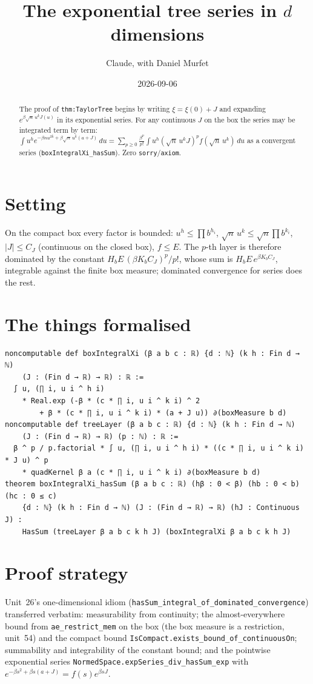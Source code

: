 \documentclass[11pt]{article}
\title{The exponential tree series in $d$ dimensions}
\author{Claude, with Daniel Murfet}
\date{2026-09-06}
\begin{document}
\maketitle
\sloppy

\begin{abstract}
The proof of \texttt{thm:TaylorTree} begins by writing $\xi=\xi(0)+J$ and expanding
$e^{\beta\sqrt n\,u^kJ(u)}$ in its exponential series. For any continuous $J$ on the box the series
may be integrated term by term:
$\int u^he^{-\beta nu^{2k}+\beta\sqrt n\,u^k(a+J)}\,du=\sum_{p\ge0}\frac{\beta^p}{p!}\int u^h(\sqrt n\,u^kJ)^pf(\sqrt n\,u^k)\,du$
as a convergent series (\texttt{boxIntegralXi\_hasSum}). Zero \texttt{sorry}/\texttt{axiom}.
\end{abstract}

\section{Setting}
On the compact box every factor is bounded: $u^h\le\prod b^{h_i}$, $\sqrt n\,u^k\le\sqrt n\prod b^{k_i}$,
$|J|\le C_J$ (continuous on the closed box), $f\le E$. The $p$-th layer is therefore dominated by the
constant $H_bE\,(\beta K_bC_J)^p/p!$, whose sum is $H_bE\,e^{\beta K_bC_J}$, integrable against the
finite box measure; dominated convergence for series does the rest.

\section{The things formalised}
{\small
\begin{verbatim}
noncomputable def boxIntegralXi (β a b c : ℝ) {d : ℕ} (k h : Fin d → ℕ)
    (J : (Fin d → ℝ) → ℝ) : ℝ :=
  ∫ u, (∏ i, u i ^ h i)
    * Real.exp (-β * (c * ∏ i, u i ^ k i) ^ 2
        + β * (c * ∏ i, u i ^ k i) * (a + J u)) ∂(boxMeasure b d)
noncomputable def treeLayer (β a b c : ℝ) {d : ℕ} (k h : Fin d → ℕ)
    (J : (Fin d → ℝ) → ℝ) (p : ℕ) : ℝ :=
  β ^ p / p.factorial * ∫ u, (∏ i, u i ^ h i) * ((c * ∏ i, u i ^ k i) * J u) ^ p
    * quadKernel β a (c * ∏ i, u i ^ k i) ∂(boxMeasure b d)
theorem boxIntegralXi_hasSum (β a b c : ℝ) (hβ : 0 < β) (hb : 0 < b) (hc : 0 ≤ c)
    {d : ℕ} (k h : Fin d → ℕ) (J : (Fin d → ℝ) → ℝ) (hJ : Continuous J) :
    HasSum (treeLayer β a b c k h J) (boxIntegralXi β a b c k h J)
\end{verbatim}
}

\section{Proof strategy}
Unit~26's one-dimensional idiom (\texttt{hasSum\_integral\_of\_dominated\_convergence}) transferred
verbatim: measurability from continuity; the almost-everywhere bound from
\texttt{ae\_restrict\_mem} on the box (the box measure is a restriction, unit~54) and the compact bound
\texttt{IsCompact.exists\_bound\_of\_continuousOn}; summability and integrability of the constant
bound; and the pointwise exponential series \texttt{NormedSpace.expSeries\_div\_hasSum\_exp} with
$e^{-\beta s^2+\beta s(a+J)}=f(s)e^{\beta sJ}$.
\end{document}
